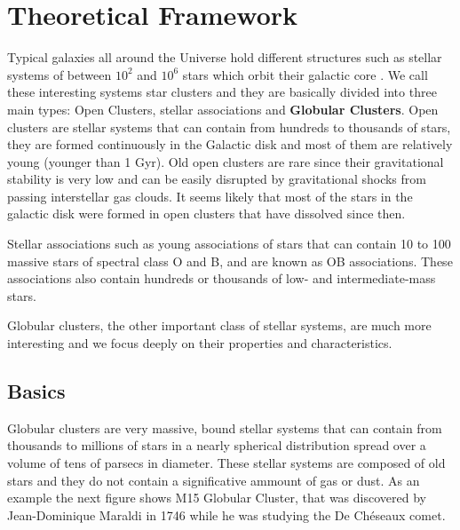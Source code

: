 \chapter{Theoretical Framework}

Typical galaxies all around the Universe hold different structures such as stellar systems of between $ 10^{2} $ and $ 10^{6} $ stars which orbit their galactic core . We call these interesting systems star clusters and they are basically divided into three main types: Open Clusters, stellar associations and \textbf{Globular Clusters}. Open clusters are stellar systems that can contain from hundreds to thousands of stars, they are formed continuously in the Galactic disk and most of them are relatively young (younger than 1 Gyr). Old open clusters are rare since their gravitational stability is very low and can be easily disrupted by gravitational shocks from passing interstellar gas clouds. It seems likely that most of the stars in the galactic disk were formed in open clusters that have dissolved since then. 

Stellar associations such as young associations of stars that can contain 10 to 100 massive stars of spectral class O and B, and are known as OB associations. These associations also contain hundreds or thousands of low- and intermediate-mass stars.

Globular clusters, the other important class of stellar systems, are much more interesting and we focus deeply on their properties and characteristics.  

\section{Basics}
 
Globular clusters are very massive, bound stellar systems that can contain from thousands to millions of stars in a nearly spherical distribution spread over a volume of tens of parsecs in diameter. These stellar systems are composed of old stars and they do not contain a significative ammount of gas or dust. As an example the next figure shows M15 Globular Cluster, that was discovered by Jean-Dominique Maraldi in 1746 while he was studying the De Chéseaux comet.

